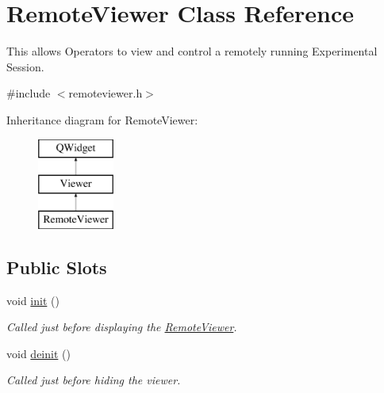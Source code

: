 \hypertarget{class_remote_viewer}{\section{Remote\-Viewer Class Reference}
\label{class_remote_viewer}
}


This allows Operators to view and control a remotely running Experimental Session.  




{\ttfamily \#include $<$remoteviewer.\-h$>$}

Inheritance diagram for Remote\-Viewer\-:\begin{figure}[H]
\begin{center}
\leavevmode
\includegraphics[height=3.000000cm]{class_remote_viewer}
\end{center}
\end{figure}
\subsection*{Public Slots}
\begin{DoxyCompactItemize}
\item 
void \hyperlink{class_remote_viewer_ae7ff2f824481f7a8b1078b556c7322ae}{init} ()
\begin{DoxyCompactList}\small\item\em Called just before displaying the \hyperlink{class_remote_viewer}{Remote\-Viewer}. \end{DoxyCompactList}\item 
void \hyperlink{class_remote_viewer_a5a3b67136d8aaaa3a6fdbb6d9b3f519e}{deinit} ()
\begin{DoxyCompactList}\small\item\em Called just before hiding the viewer. \end{DoxyCompactList}\end{DoxyCompactItemize}
